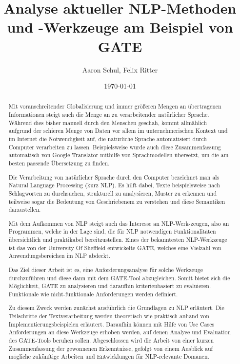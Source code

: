 \documentclass[12pt]{report}
\begin{document}
\title{Analyse aktueller NLP-Methoden und -Werkzeuge am Beispiel von GATE}
\author{Aaron Schul, Felix Ritter}
\date{\today}
\maketitle

\newpage
\begin{abstract}
Mit voranschreitender Globalisierung und immer größeren Mengen an übertragenen Informationen steigt auch die Menge an zu verarbeitender natürlicher Sprache. Während dies bisher manuell durch den Menschen geschah, kommt allmählich aufgrund der schieren Menge von Daten vor allem im unternehmerischen Kontext und im Internet die Notwendigkeit auf, die natürliche Sprache automatisiert durch Computer verarbeiten zu lassen. Beispielsweise wurde auch diese Zusammenfassung automatisch von Google Translator mithilfe von Sprachmodellen übersetzt, um die am besten passende Übersetzung zu finden.

Die Verarbeitung von natürlicher Sprache durch den Computer bezeichnet man als Natural Language Processing (kurz NLP). Es hilft dabei, Texte beispielsweise nach Schlagworten zu durchsuchen, strukturell zu analysieren, Muster zu erkennen und teilweise sogar die Bedeutung von Geschriebenem zu verstehen und diese Semantiken darzustellen.

Mit dem Aufkommen von NLP steigt auch das Interesse an NLP-Werk-zeugen, also an Programmen, welche in der Lage sind, die für NLP notwendigen Funktionalitäten übersichtlich und praktikabel bereitzustellen. Eines der bekanntesten NLP-Werkzeuge ist das von der University Of Sheffield entwickelte GATE, welches eine Vielzahl von Anwendungsbereichen im NLP abdeckt.

Das Ziel dieser Arbeit ist es, eine Anforderungsanalyse für solche Werkzeuge durchzuführen und diese dann mit dem GATE-Tool abzugleichen. Somit bietet sich die Möglichkeit, GATE zu analysieren und daraufhin kriterienbasiert zu evaluieren. Funktionale wie nicht-funktionale Anforderungen werden definiert.

Zu diesem Zweck werden zunächst ausführlich die Grundlagen zu NLP erläutert. Die Teilschritte der Textverarbeitung werden theoretisch wie praktisch anhand von Implementierungsbeispielen erläutert. Daraufhin können mit Hilfe von Use Cases Anforderungen an diese Werkzeuge erhoben werden, auf denen Analyse und Evaluation des GATE-Tools beruhen sollen. Abgeschlossen wird die Arbeit von einer kurzen Zusammenfassung der gewonnenen Erkenntnisse, gefolgt von einem Ausblick auf mögliche zukünftige Arbeiten und Entwicklungen für NLP-relevante Domänen.
\end{abstract}
\end{document}
